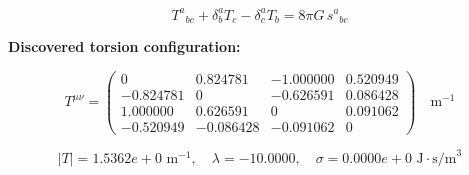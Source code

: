 
\begin{equation}
  T^a{}_{bc} + \delta^a_b T_c - \delta^a_c T_b = 8\pi G \, s^a{}_{bc}
\end{equation}

\textbf{Discovered torsion configuration:}

\begin{equation}
  T^{\mu\nu} = \begin{pmatrix}
    0 & 0.824781 & -1.000000 & 0.520949 \\
    -0.824781 & 0 & -0.626591 & 0.086428 \\
    1.000000 & 0.626591 & 0 & 0.091062 \\
    -0.520949 & -0.086428 & -0.091062 & 0
  \end{pmatrix} \quad \text{m}^{-1}
\end{equation}

\begin{equation}
  |T| = 1.5362e+0 \text{ m}^{-1}, \quad
  \lambda = -10.0000, \quad
  \sigma = 0.0000e+0 \text{ J}\cdot\text{s/m}^3
\end{equation}